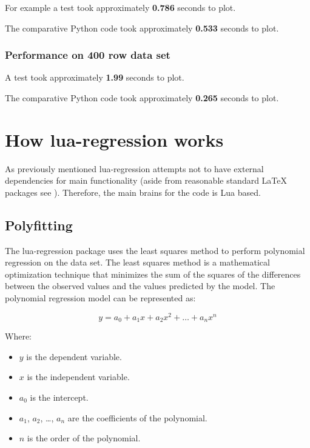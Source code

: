 \documentclass[11pt]{article}
\begin{document}
    For example a test took approximately \textbf{0.786} seconds to plot.
   
    The comparative Python code took approximately \textbf{0.533} seconds to plot.

    \subsubsection{Performance on 400 row data set}

    A test took approximately \textbf{1.99} seconds to plot.
    
    The comparative Python code took approximately \textbf{0.265} seconds to plot.

    \section{How {\ttfamily lua-regression} works}
    
    As previously mentioned {\ttfamily lua-regression} attempts not to have external dependencies for main functionality (aside from reasonable standard \LaTeX{} packages see ). Therefore, the main brains for the code is Lua based.

    \subsection{Polyfitting}

    The {\ttfamily lua-regression} package uses the least squares method to perform polynomial regression on the data set.
    The least squares method is a mathematical optimization technique that minimizes the sum of the squares of the differences between the observed values and the values predicted by the model.
    The polynomial regression model can be represented as:

    \begin{equation}
        y = a_0 + a_1x + a_2x^2 + \ldots + a_nx^n
    \end{equation}

    
    Where:

    \begin{itemize}
        \item $y$ is the dependent variable.
        \item $x$ is the independent variable.
        \item $a_0$ is the intercept.
        \item $a_1$, $a_2$, \ldots, $a_n$ are the coefficients of the polynomial.
        \item $n$ is the order of the polynomial.
    \end{itemize}
\end{document}
